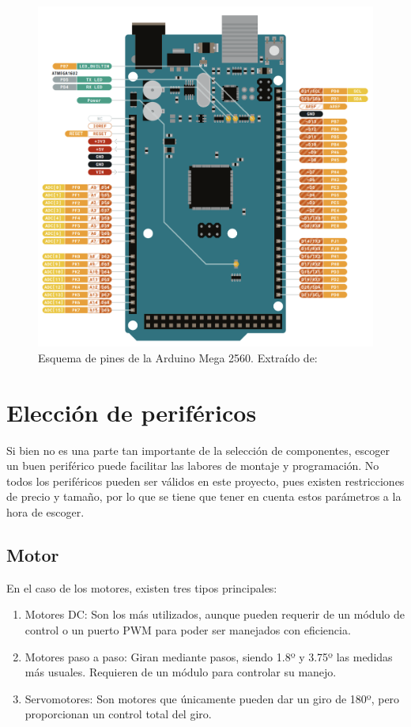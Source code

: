     \begin{figure}[H]
        \centering
        \includegraphics[width=1\textwidth]{imagenes/pinout_amega2560.png}
        \caption{Esquema de pines de la Arduino Mega 2560. Extraído de: \cite{arduino_mega}}
    \end{figure}
 

\section{Elección de periféricos}
 
Si bien no es una parte tan importante de la selección de componentes, escoger un buen periférico puede facilitar las labores de montaje y programación. No todos los periféricos pueden ser válidos en este proyecto, pues existen restricciones de precio y tamaño, por lo que se tiene que tener en cuenta estos parámetros a la hora de escoger. 



 \subsection{Motor}

 En el caso de los motores, existen tres tipos principales: 

 \begin{enumerate}
  \item Motores DC: Son los más utilizados, aunque pueden requerir de un módulo de control o un puerto PWM para poder ser manejados con eficiencia.
  \item Motores paso a paso: Giran mediante pasos, siendo 1.8º y 3.75º las medidas más usuales. Requieren de un módulo para controlar su manejo.
  \item Servomotores: Son motores que únicamente pueden dar un giro de 180º, pero proporcionan un control total del giro.
 \end{enumerate}

